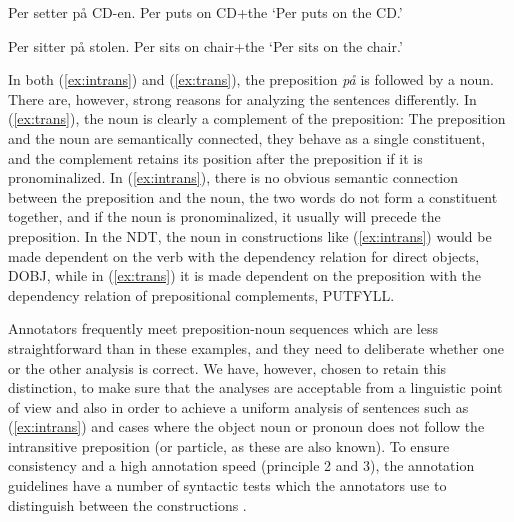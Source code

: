 \documentclass[10pt,a4paper]{article}
\begin{document}
\begin{examples}
\item\label{ex:intrans}
\gll Per setter på CD-en.
Per puts on CD+the
\glt `Per puts on the CD.'
\glend

\item\label{ex:trans}
\gll Per sitter på stolen.
Per sits on chair+the
\glt `Per sits on the chair.'
\glend
\end{examples}

In both (\ref{ex:intrans}) and (\ref{ex:trans}), the preposition \emph{på} is followed by a noun. There are, however, strong reasons for analyzing the sentences differently. In (\ref{ex:trans}), the noun is clearly a complement of the preposition: The preposition and the noun are semantically connected, they behave as a single constituent, and the complement retains its position after the preposition if it is pronominalized. In (\ref{ex:intrans}), there is no obvious semantic connection between the preposition and the noun, the two words do not form a constituent together, and if the noun is pronominalized, it usually will precede the preposition. In the NDT, the noun in constructions like (\ref{ex:intrans}) would be made dependent on the verb with the dependency relation for direct objects, DOBJ, while in (\ref{ex:trans}) it is made dependent on the preposition with the dependency relation of prepositional complements, PUTFYLL.

Annotators frequently meet preposition-noun sequences which are less straightforward than in these examples, and they need to deliberate whether one or the other analysis is correct. We have, however, chosen to retain this distinction, to make sure that the analyses are acceptable from a linguistic point of view and also in order to achieve a uniform analysis of sentences such as (\ref{ex:intrans}) and cases where the object noun or pronoun does not follow the intransitive preposition (or particle, as these are also known). To ensure consistency and a high annotation speed (principle 2 and 3), the annotation guidelines have a number of syntactic tests which the annotators use to distinguish between the constructions \cite[54-56]{Kin:Sol:Eri:2013}.
\end{document}
